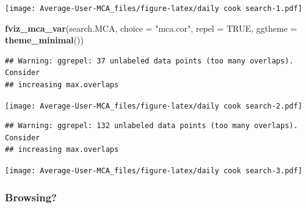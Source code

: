 \documentclass[
]{article}
\newenvironment{Shaded}{\begin{snugshade}}{\end{snugshade}}
\newcommand{\DataTypeTok}[1]{\textcolor[rgb]{0.13,0.29,0.53}{#1}}
\newcommand{\KeywordTok}[1]{\textcolor[rgb]{0.13,0.29,0.53}{\textbf{#1}}}
\newcommand{\NormalTok}[1]{#1}
\newcommand{\OtherTok}[1]{\textcolor[rgb]{0.56,0.35,0.01}{#1}}
\newcommand{\StringTok}[1]{\textcolor[rgb]{0.31,0.60,0.02}{#1}}
\begin{document}
\texttt{[image: Average-User-MCA\_files/figure-latex/daily cook search-1.pdf]}

\begin{Shaded}
\begin{Highlighting}[]
\KeywordTok{fviz_mca_var}\NormalTok{(search.MCA, }\DataTypeTok{choice =} \StringTok{"mca.cor"}\NormalTok{, }\DataTypeTok{repel =} \OtherTok{TRUE}\NormalTok{,}
             \DataTypeTok{ggtheme =} \KeywordTok{theme_minimal}\NormalTok{())}
\end{Highlighting}
\end{Shaded}

\begin{verbatim}
## Warning: ggrepel: 37 unlabeled data points (too many overlaps). Consider
## increasing max.overlaps
\end{verbatim}

\texttt{[image: Average-User-MCA\_files/figure-latex/daily cook search-2.pdf]}

\begin{Shaded}
\end{Shaded}

\begin{verbatim}
## Warning: ggrepel: 132 unlabeled data points (too many overlaps). Consider
## increasing max.overlaps
\end{verbatim}

\texttt{[image: Average-User-MCA\_files/figure-latex/daily cook search-3.pdf]}

\hypertarget{browsing-4}{%
\subsubsection{Browsing?}\label{browsing-4}}
\end{document}
